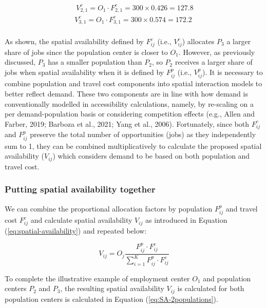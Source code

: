 \documentclass[]{elsarticle} %
\begin{document}
\begin{equation}
\label{eq:tcost-allocation-factor-SA-2populations}
\begin{array}{l}\
V^c_{2,1} = O_1 \cdot F^c_{2,1} = 300 \times 0.426 = 127.8\\
V^c_{3,1} = O_1 \cdot F^c_{3,1} = 300 \times  0.574 = 172.2\\
\end{array}
\end{equation}

As shown, the spatial availability defined by \(F^c_{ij}\) (i.e.,
\(V^c_{ij}\)) allocates \(P_3\) a larger share of jobs since the
population center is closer to \(O_1\). However, as previously
discussed, \(P_3\) has a smaller population than \(P_2\), so \(P_2\)
receives a larger share of jobs when spatial availability when it is
defined by \(F^p_{ij}\) (i.e., \(V^p_{ij}\)). It is necessary to combine
population and travel cost components into spatial interaction models to
better reflect demand. These two components are in line with how demand
is conventionally modelled in accessibility calculations, namely, by
re-scaling on a per demand-population basis or considering competition
effects (e.g., Allen and Farber, 2019; Barboza et al., 2021; Yang et
al., 2006). Fortunately, since both \(F^c_{ij}\) and \(F^p_{ij}\)
preserve the total number of opportunities (jobs) as they independently
sum to 1, they can be combined multiplicatively to calculate the
proposed spatial availability (\(V_{ij}\)) which considers demand to be
based on both population and travel cost.

\hypertarget{putting-spatial-availability-together}{%
\subsubsection{Putting spatial availability
together}\label{putting-spatial-availability-together}}

We can combine the proportional allocation factors by population
\(F^p_{ij}\) and travel cost \(F^c_{ij}\) and calculate spatial
availability \(V_{ij}\) as introduced in Equation
(\ref{eq:spatial-availability}) and repeated below:

\[
V_{ij} = O_j\frac{F^p_{ij} \cdot F^c_{ij}}{\sum_{i=1}^K F^p_{ij} \cdot F^c_{ij}}
\]

To complete the illustrative example of employment center \(O_1\) and
population centers \(P_2\) and \(P_3\), the resulting spatial
availability \(V_{ij}\) is calculated for both population centers is
calculated in Equation (\ref{eq:SA-2populations}).
\end{document}
